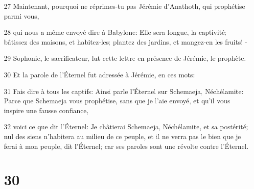 \par 27 Maintenant, pourquoi ne réprimes-tu pas Jérémie d'Anathoth, qui prophétise parmi vous,
\par 28 qui nous a même envoyé dire à Babylone: Elle sera longue, la captivité; bâtissez des maisons, et habitez-les; plantez des jardins, et mangez-en les fruits! -
\par 29 Sophonie, le sacrificateur, lut cette lettre en présence de Jérémie, le prophète. -
\par 30 Et la parole de l'Éternel fut adressée à Jérémie, en ces mots:
\par 31 Fais dire à tous les captifs: Ainsi parle l'Éternel sur Schemaeja, Néchélamite: Parce que Schemaeja vous prophétise, sans que je l'aie envoyé, et qu'il vous inspire une fausse confiance,
\par 32 voici ce que dit l'Éternel: Je châtierai Schemaeja, Néchélamite, et sa postérité; nul des siens n'habitera au milieu de ce peuple, et il ne verra pas le bien que je ferai à mon peuple, dit l'Éternel; car ses paroles sont une révolte contre l'Éternel.

\chapter{30}

